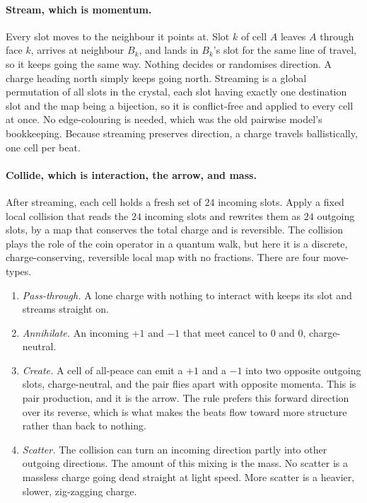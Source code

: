 \paragraph{Stream, which is momentum.} Every slot moves to the neighbour it points at. Slot $k$ of cell $A$
leaves $A$ through face $k$, arrives at neighbour $B_k$, and lands in $B_k$'s slot for the same line of travel,
so it keeps going the same way. Nothing decides or randomises direction. A charge heading north simply keeps
going north. Streaming is a global permutation of all slots in the crystal, each slot having exactly one
destination slot and the map being a bijection, so it is conflict-free and applied to every cell at once. No
edge-colouring is needed, which was the old pairwise model's bookkeeping. Because streaming preserves direction, a
charge travels ballistically, one cell per beat.

\paragraph{Collide, which is interaction, the arrow, and mass.} After streaming, each cell holds a fresh set of
$24$ incoming slots. Apply a fixed local collision that reads the $24$ incoming slots and rewrites them as $24$
outgoing slots, by a map that conserves the total charge and is reversible. The collision plays the role of the
coin operator in a quantum walk, but here it is a discrete, charge-conserving, reversible local map with no
fractions. There are four move-types.

\begin{enumerate}
\item \emph{Pass-through.} A lone charge with nothing to interact with keeps its slot and streams straight on.
\item \emph{Annihilate.} An incoming $+1$ and $-1$ that meet cancel to $0$ and $0$, charge-neutral.
\item \emph{Create.} A cell of all-peace can emit a $+1$ and a $-1$ into two opposite outgoing slots,
charge-neutral, and the pair flies apart with opposite momenta. This is pair production, and it is the arrow. The
rule prefers this forward direction over its reverse, which is what makes the beats flow toward more structure
rather than back to nothing.
\item \emph{Scatter.} The collision can turn an incoming direction partly into other outgoing directions. The
amount of this mixing is the mass. No scatter is a massless charge going dead straight at light speed. More
scatter is a heavier, slower, zig-zagging charge.
\end{enumerate}

